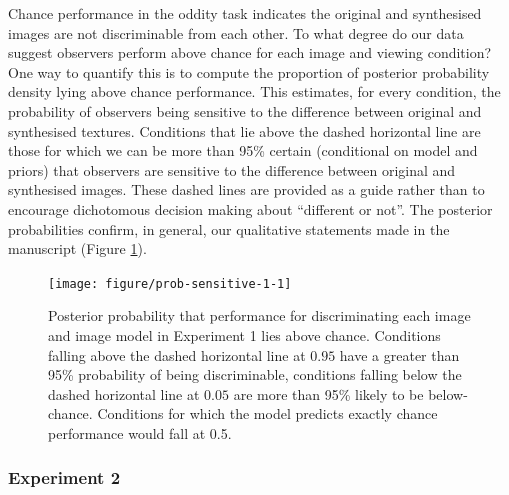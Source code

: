 \documentclass[article, 11pt,a4paper,natbib]{apa6}\usepackage[]{graphicx}\usepackage[]{color}
\newenvironment{knitrout}{}{} %
\begin{document}
Chance performance in the oddity task indicates the original and synthesised images are not discriminable from each other.
To what degree do our data suggest observers perform above chance for each image and viewing condition?
One way to quantify this is to compute the proportion of posterior probability density lying above chance performance.
This estimates, for every condition, the probability of observers being sensitive to the difference between original and synthesised textures.
Conditions that lie above the dashed horizontal line are those for which we can be more than 95\% certain (conditional on model and priors) that observers are  sensitive to the difference between original and synthesised images.
These dashed lines are provided as a guide rather than to encourage dichotomous decision making about ``different or not''.
The posterior probabilities confirm, in general, our qualitative statements made in the manuscript (Figure \ref{fig:prob-sensitive-1}).




\begin{knitrout}
\color{fgcolor}\begin{figure}
\texttt{[image: figure/prob-sensitive-1-1]} \caption[Posterior probability that performance for discriminating each image and image model in Experiment 1 lies above chance.
              Conditions falling above the dashed horizontal line at $0.95$ have a greater than 95\% 
              probability of being discriminable, conditions falling below the dashed horizontal line at $0.05$ are more than 95\% likely to be below-chance.
              Conditions for which the model predicts exactly chance performance would fall at 0.5]{Posterior probability that performance for discriminating each image and image model in Experiment 1 lies above chance.
              Conditions falling above the dashed horizontal line at $0.95$ have a greater than 95\% 
              probability of being discriminable, conditions falling below the dashed horizontal line at $0.05$ are more than 95\% likely to be below-chance.
              Conditions for which the model predicts exactly chance performance would fall at 0.5.}\label{fig:prob-sensitive-1}
\end{figure}


\end{knitrout}


\subsubsection{Experiment 2}
\end{document}
